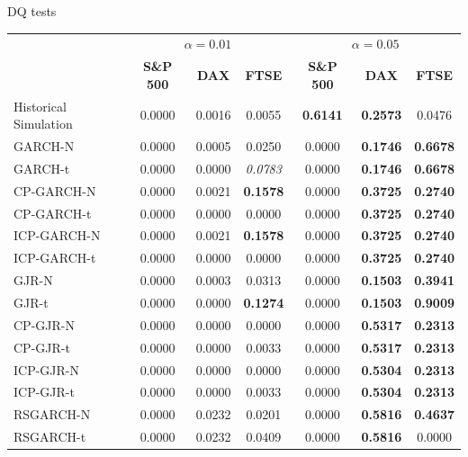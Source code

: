 \documentclass[preprint,12pt,authoryear]{elsarticle}
\begin{document}
\begin{center}
\begin{threeparttable}
\centering \footnotesize
\caption{\footnotesize DQ tests}\label{tab8}
\begin{tabular}{l c c c c c c}
\toprule
 & \multicolumn{3}{c}{\textbf{$\alpha=0.01$}} & \multicolumn{3}{c}{\textbf{$\alpha=0.05$}}\\
 \cmidrule(r){2-4} \cmidrule(r){5-7}
 & \textbf{S\&P 500} & \textbf{DAX} & \textbf{FTSE} & \textbf{S\&P 500} & \textbf{DAX} & \textbf{FTSE}\\
\cmidrule{2-7}
Historical Simulation & 0.0000   & 0.0016 & 0.0055 & \textbf{0.6141} & \textbf{0.2573} & 0.0476 \\
GARCH-N               & 0.0000   & 0.0005 & 0.0250 & 0.0000 & \textbf{0.1746} & \textbf{0.6678} \\
GARCH-t               & 0.0000   & 0.0000 & \textit{0.0783} & 0.0000 & \textbf{0.1746} & \textbf{0.6678} \\
CP-GARCH-N            & 0.0000   & 0.0021 & \textbf{0.1578} & 0.0000 & \textbf{0.3725} & \textbf{0.2740} \\
CP-GARCH-t            & 0.0000   & 0.0000 & 0.0000 & 0.0000 & \textbf{0.3725} & \textbf{0.2740} \\
ICP-GARCH-N           & 0.0000   & 0.0021 & \textbf{0.1578} & 0.0000 & \textbf{0.3725} & \textbf{0.2740} \\
ICP-GARCH-t           & 0.0000   & 0.0000 & 0.0000 & 0.0000 & \textbf{0.3725} & \textbf{0.2740} \\
GJR-N                 & 0.0000   & 0.0003 & 0.0313 & 0.0000 & \textbf{0.1503} & \textbf{0.3941} \\
GJR-t                 & 0.0000   & 0.0000 & \textbf{0.1274} & 0.0000 & \textbf{0.1503} & \textbf{0.9009} \\
CP-GJR-N              & 0.0000   & 0.0000 & 0.0000 & 0.0000 & \textbf{0.5317} & \textbf{0.2313} \\
CP-GJR-t              & 0.0000   & 0.0000 & 0.0033 & 0.0000 & \textbf{0.5317} & \textbf{0.2313} \\
ICP-GJR-N             & 0.0000   & 0.0000 & 0.0000 & 0.0000 & \textbf{0.5304} & \textbf{0.2313} \\
ICP-GJR-t             & 0.0000   & 0.0000 & 0.0033 & 0.0000 & \textbf{0.5304} & \textbf{0.2313} \\
RSGARCH-N             & 0.0000   & 0.0232 & 0.0201 & 0.0000 & \textbf{0.5816} & \textbf{0.4637} \\
RSGARCH-t             & 0.0000   & 0.0232 & 0.0409 & 0.0000 & \textbf{0.5816} & 0.0000 \\

\end{tabular}
\end{threeparttable}
\end{center}
\end{document}
